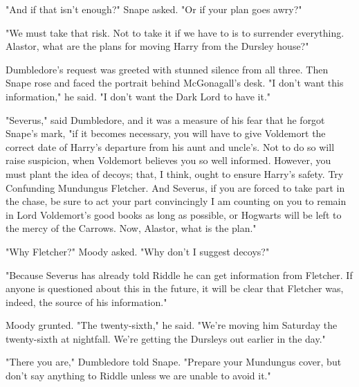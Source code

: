"And if that isn't enough?" Snape asked. "Or if your plan goes awry?"

"We must take that risk. Not to take it if we have to is to surrender everything. Alastor, what are the plans for moving Harry from the Dursley house?"

Dumbledore's request was greeted with stunned silence from all three. Then Snape rose and faced the portrait behind McGonagall's desk. "I don't want this information," he said. "I don't want the Dark Lord to have it."

"Severus," said Dumbledore, and it was a measure of his fear that he forgot Snape's mark, "if it becomes necessary, you will have to give Voldemort the correct date of Harry's departure from his aunt and uncle's. Not to do so will raise suspicion, when Voldemort believes you so well informed. However, you must plant the idea of decoys; that, I think, ought to ensure Harry's safety. Try Confunding Mundungus Fletcher. And Severus, if you are forced to take part in the chase, be sure to act your part convincingly{\el} I am counting on you to remain in Lord Voldemort's good books as long as possible, or Hogwarts will be left to the mercy of the Carrows. Now, Alastor, what is the plan."

"Why Fletcher?" Moody asked. "Why don't I suggest decoys?"

"Because Severus has already told Riddle he can get information from Fletcher. If anyone is questioned about this in the future, it will be clear that Fletcher was, indeed, the source of his information."

Moody grunted. "The twenty-sixth," he said. "We're moving him Saturday the twenty-sixth at nightfall. We're getting the Dursleys out earlier in the day."

"There you are," Dumbledore told Snape. "Prepare your Mundungus cover, but don't say anything to Riddle unless we are unable to avoid it." 


